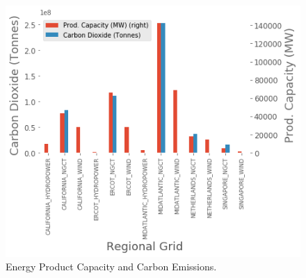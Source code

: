 \begin{figure}[hb!]
  \centering
  \includegraphics[scale=0.5]{marginal_energy_cost/img/sources.png}
  \caption[Energy Product Capacity and Carbon Emissions]{Energy Product Capacity and Carbon Emissions.}
  \label{fig:source_prod_comp}
  \end{figure}
